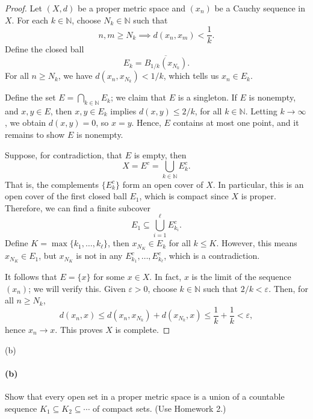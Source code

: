 \documentclass[12pt]{article}
\newlength{\myparskip}
\newenvironment{fullbox}{\begin{lrbox}{\savefullbox}\begin{minipage}{\dimexpr\textwidth-2\fboxsep\relax}\setlength{\parskip}{\myparskip}}{\end{minipage}\end{lrbox}\framebox[\textwidth]{\usebox{\savefullbox}}}
\newenvironment{pbox}[1][]{\begin{fullbox}\ifx#1\empty\else\paragraph{#1}\fi}{\end{fullbox}}
\theoremstyle{definition}
\newcommand{\N}{\mathbb{N}}
\newcommand{\eps}{\varepsilon}
\newcommand{\<}{\langle}
\renewcommand{\>}{\rangle}
\newcommand{\clo}{\overline}
\begin{document}
\begin{proof}
    Let $(X, d)$ be a proper metric space and $(x_n)$ be a Cauchy sequence in $X$. For each $k \in \N$, choose $N_k \in \N$ such that
    \[
        n, m \geq N_k \implies d(x_n, x_m) < \frac{1}{k}.
    \]
    Define the closed ball
    \[
        E_k = \clo{B_{1/k}(x_{N_k})}.
    \]
    For all $n \geq N_k$, we have $d(x_n, x_{N_k}) < 1/k$, which tells us $x_n \in E_k$.
    
    Define the set $E = \bigcap_{k \in \N} E_k$; we claim that $E$ is a singleton. If $E$ is nonempty, and $x, y \in E$, then $x, y \in E_k$ implies $d(x, y) \leq 2/k$, for all $k \in \N$. Letting $k \to \infty$, we obtain $d(x, y) = 0$, so $x = y$. Hence, $E$ contains at most one point, and it remains to show $E$ is nonempty.

    Suppose, for contradiction, that $E$ is empty, then
    \[
        X = E^c = \bigcup_{k \in \N} E_k^c.
    \]
    That is, the complements $\{E_k^c\}$ form an open cover of $X$. In particular, this is an open cover of the first closed ball $E_1$, which is compact since $X$ is proper. Therefore, we can find a finite subcover
    \[
        E_1 \subseteq \bigcup_{i=1}^{\ell} E_{k_i}^c.
    \]
    Define $K = \max\{k_1, \dots, k_\ell\}$, then $x_{N_K} \in E_k$ for all $k \leq K$. However, this means $x_{N_K} \in E_1$, but $x_{N_K}$ is not in any $E_{k_1}^c, \dots, E_{k_\ell}^c$, which is a contradiction.

    It follows that $E = \{x\}$ for some $x \in X$. In fact, $x$ is the limit of the sequence $(x_n)$; we will verify this. Given $\eps > 0$, choose $k \in \N$ such that $2/k < \eps$. Then, for all $n \geq N_k$,
    \[
        d(x_n, x) \leq d(x_n, x_{N_k}) + d(x_{N_k}, x) \leq \frac{1}{k} + \frac{1}{k} < \eps,
    \]
    hence $x_n \to x$. This proves $X$ is complete.
\end{proof}


\newpage
\begin{pbox}[(b)]
    Show that every open set in a proper metric space is a union of a countable sequence $K_1 \subseteq K_2 \subseteq \cdots$ of compact sets. (Use Homework 2.)
\end{pbox}
\end{document}
